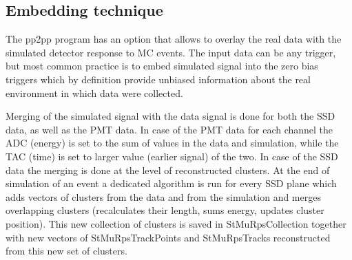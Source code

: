 
\subsection{Embedding technique}

The pp2pp program has an option that allows to overlay the real data with the simulated detector response to MC events. The input data can be any trigger, but most common practice is to embed simulated signal into the zero bias triggers which by definition provide unbiased information about the real environment in which data were collected.

Merging of the simulated signal with the data signal is done for both the SSD data, as well as the PMT data. In case of the PMT data for each channel the ADC (energy) is set to the sum of values in the data and simulation, while the TAC (time) is set to larger value (earlier signal) of the two. In case of the SSD data the merging is done at the level of reconstructed clusters. At the end of simulation of an event a dedicated algorithm is run for every SSD plane which adds vectors of clusters from the data and from the simulation and merges overlapping clusters (recalculates their length, sums energy, updates cluster position). This new collection of clusters is saved in StMuRpsCollection together with new vectors of StMuRpsTrackPoints and StMuRpsTracks reconstructed from this new set of clusters.

